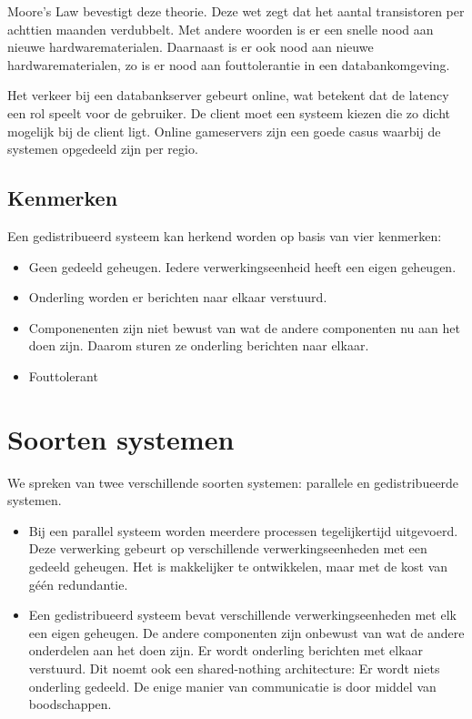 \documentclass[a4paper,10pt,twoside]{report}
\begin{document}
Moore's Law bevestigt deze theorie. Deze wet zegt dat het aantal transistoren per achttien maanden verdubbelt. Met andere woorden is er een snelle nood aan nieuwe hardwarematerialen. Daarnaast is er ook nood aan nieuwe hardwarematerialen, zo is er nood aan fouttolerantie in een databankomgeving. 

Het verkeer bij een databankserver gebeurt online, wat betekent dat de latency een rol speelt voor de gebruiker. De client moet een systeem kiezen die zo dicht mogelijk bij de client ligt. Online gameservers zijn een goede casus waarbij de systemen opgedeeld zijn per regio.

\subsection{Kenmerken}

Een gedistribueerd systeem kan herkend worden op basis van vier kenmerken:

\begin{itemize}
	\item Geen gedeeld geheugen. Iedere verwerkingseenheid heeft een eigen geheugen.
	\item Onderling worden er berichten naar elkaar verstuurd.
	\item Componenenten zijn niet bewust van wat de andere componenten nu aan het doen zijn. Daarom sturen ze onderling berichten naar elkaar.
	\item Fouttolerant
\end{itemize}

\section{Soorten systemen}

We spreken van twee verschillende soorten systemen: parallele en gedistribueerde systemen.

\begin{itemize}
	\item Bij een parallel systeem worden meerdere processen tegelijkertijd uitgevoerd. Deze verwerking gebeurt op verschillende verwerkingseenheden met een gedeeld geheugen. Het is makkelijker te ontwikkelen, maar met de kost van géén redundantie.
	\item Een gedistribueerd systeem bevat verschillende verwerkingseenheden met elk een eigen geheugen. De andere componenten zijn onbewust van wat de andere onderdelen aan het doen zijn. Er wordt onderling berichten met elkaar verstuurd. Dit noemt ook een shared-nothing architecture: Er wordt niets onderling gedeeld. De enige manier van communicatie is door middel van boodschappen.
\end{itemize}
\end{document}
